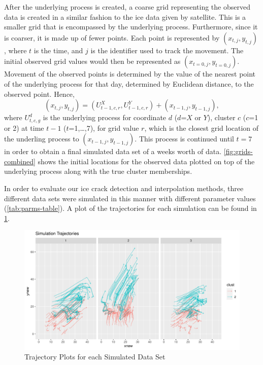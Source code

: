 \documentclass[12pt]{article}
\begin{document}
After the underlying process is created, a coarse grid representing the
observed data is created in a similar fashion to the ice data given by
satellite. This is a smaller grid that is encompassed by the underlying
process. Furthermore, since it is coarser, it is made up of fewer
points. Each point is represented by \((x_{t,j}, y_{t,j})\), where \(t\)
is the time, and \(j\) is the identifier used to track the movement. The
initial observed grid values would then be represented as
\((x_{t=0,j}, y_{t=0,j})\). Movement of the observed points is
determined by the value of the nearest point of the underlying process
for that day, determined by Euclidean distance, to the observed point.
Hence,
\[(x_{t,j}, y_{t,j}) = (U^{X}_{t-1,c,r}, U^{Y}_{t-1,c,r}) + (x_{t-1,j}, y_{t-1,j}),\]
where \(U^d_{t,c,g}\) is the underlying process for coordinate \(d\)
(\(d\)=\(X\) or \(Y\)), cluster \(c\) (\(c\)=1 or 2) at time \(t-1\)
(\(t\)=1,\ldots,7), for grid value \(r\), which is the closest grid
location of the underling process to \((x_{t-1,j}, y_{t-1,j})\). This
process is continued until \(t=7\) in order to obtain a final simulated
data set of a weeks worth of data. \cref{fig:grids-combined} shows the
initial locations for the observed data plotted on top of the underlying
process along with the true cluster memberships.

In order to evaluate our ice crack detection and interpolation methods,
three different data sets were simulated in this manner with different
parameter values (\cref{tab:parms-table}). A plot of the trajectories
for each simulation can be found in \cref{fig:traj-wrap}.

\begin{figure}[tbp]

{\centering \includegraphics[width=\linewidth,]{spatio-temporal-model-arctic-sea-ice_files/figure-latex/traj-wrap-1} 

}

\caption{Trajectory Plots for each Simulated Data Set }\label{fig:traj-wrap}
\end{figure}
\end{document}
